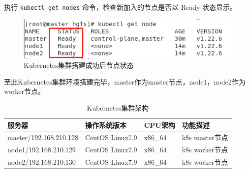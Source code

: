 执行 \texttt{kubectl get nodes} 命令，检查新加入的节点是否以 Ready 状态显示。
\begin{figure}[htb]
\centering
\includegraphics[width=1.0\textwidth]{figures/chapter2/getnode.png}
\caption{Kubernetes集群搭建成功后节点状态}
\label{fig:Kubernetes集群搭建成功后节点状态}
\end{figure}
至此Kubernetes集群环境搭建完毕，master作为master节点，node1，node2作为worker节点。
\begin{table}[ht]\centering
\begin{tabular}{l|l|l|l}
	\hline\hline
	服务器& 操作系统版本&	CPU架构&	功能描述\\ \hline
	master/192.168.210.128&CentOS Linux7.9&	x86\_64&k8s master节点 \\ \hline
	node1/192.168.210.129& CentOS Linux7.9&x86\_64&k8s worker节点\\ \hline
	node2/192.168.210.130& CentOS Linux7.9&x86\_64&k8s worker节点\\ 
	\hline\hline
\end{tabular}
\caption{Kubernetes集群架构}
\end{table}
